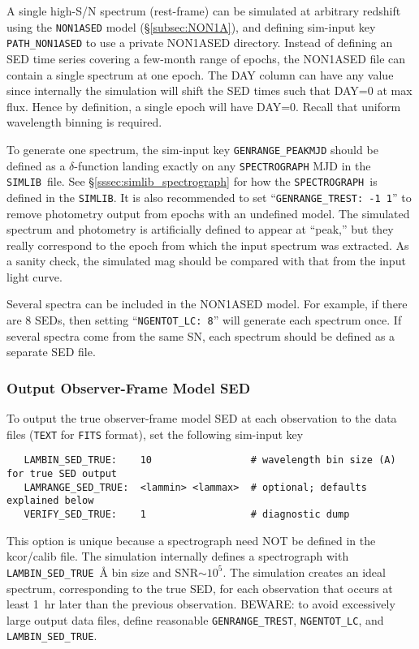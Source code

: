 \documentclass[12pt]{article}
\newcommand{\SPEC}{{\tt SPECTROGRAPH}}
\newcommand{\simlib}{{\tt SIMLIB}}
\begin{document}
A single high-S/N spectrum (rest-frame) can be simulated 
at arbitrary redshift using the {\tt NON1ASED} model 
(\S\ref{subsec:NON1A}), and defining sim-input key 
{\tt PATH\_NON1ASED} to use a private NON1ASED directory.
Instead of defining an SED time
series covering a few-month range of epochs, the NON1ASED
file can contain a single spectrum at one epoch. 
The DAY column can have any value since internally the
simulation will shift the SED times such that DAY=0 
at max flux. Hence by definition, a single epoch will
have DAY=0. Recall that uniform wavelength binning is required.

To generate one spectrum, the sim-input key {\tt GENRANGE\_PEAKMJD}
should be defined as a $\delta$-function landing exactly on any
{\SPEC} MJD in the \simlib\ file.
See \S\ref{sssec:simlib_spectrograph} for how the
\SPEC\ is defined in the \simlib.
It is also recommended to set ``{\tt GENRANGE\_TREST: -1 1}''
to remove photometry output from epochs with an undefined model.
The simulated spectrum and photometry is artificially defined
to appear at ``peak,'' but they really correspond to the epoch
from which the input spectrum was extracted. 
As a sanity check, the simulated mag should be compared with 
that from the input light curve.

Several spectra can be included in the NON1ASED model.
For example, if there are 8 SEDs, then setting 
``{\tt NGENTOT\_LC: 8}'' will generate each spectrum once.
If several spectra come from the same SN,
each spectrum should be defined as a separate SED file.


\subsubsection{Output Observer-Frame Model SED}
\label{sss:modelSED}

To output the true observer-frame model SED at each observation
to the data files ({\tt TEXT} for {\tt FITS} format),
set the following sim-input key
 \begin{verbatim}
   LAMBIN_SED_TRUE:    10                 # wavelength bin size (A) for true SED output
   LAMRANGE_SED_TRUE:  <lammin> <lammax>  # optional; defaults explained below
   VERIFY_SED_TRUE:    1                  # diagnostic dump
\end{verbatim}
%
This option is unique because
a spectrograph need NOT be defined in the kcor/calib file.
The simulation internally defines a spectrograph with 
{\tt LAMBIN\_SED\_TRUE}~{\AA} bin size and SNR${\sim}10^5$. 
The simulation creates an ideal spectrum,
corresponding to the true SED, for each observation
that occurs at least 1~hr later than the previous observation.
BEWARE: to avoid excessively large output data files,
define reasonable {\tt GENRANGE\_TREST}, {\tt NGENTOT\_LC},
and {\tt LAMBIN\_SED\_TRUE}.
\end{document}
